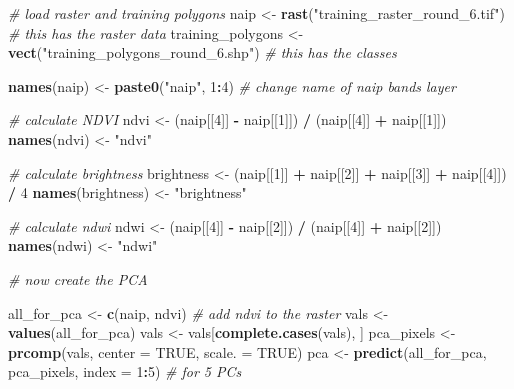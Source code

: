 \documentclass[
]{article}
\newenvironment{Shaded}{\begin{snugshade}}{\end{snugshade}}
\newcommand{\AttributeTok}[1]{\textcolor[rgb]{0.13,0.29,0.53}{#1}}
\newcommand{\CommentTok}[1]{\textcolor[rgb]{0.56,0.35,0.01}{\textit{#1}}}
\newcommand{\ConstantTok}[1]{\textcolor[rgb]{0.56,0.35,0.01}{#1}}
\newcommand{\DecValTok}[1]{\textcolor[rgb]{0.00,0.00,0.81}{#1}}
\newcommand{\FunctionTok}[1]{\textcolor[rgb]{0.13,0.29,0.53}{\textbf{#1}}}
\newcommand{\NormalTok}[1]{#1}
\newcommand{\OtherTok}[1]{\textcolor[rgb]{0.56,0.35,0.01}{#1}}
\newcommand{\SpecialCharTok}[1]{\textcolor[rgb]{0.81,0.36,0.00}{\textbf{#1}}}
\newcommand{\StringTok}[1]{\textcolor[rgb]{0.31,0.60,0.02}{#1}}
\begin{document}
\begin{Shaded}
\begin{Highlighting}[]
\CommentTok{\# load raster and training polygons}
\NormalTok{naip }\OtherTok{\textless{}{-}} \FunctionTok{rast}\NormalTok{(}\StringTok{"training\_raster\_round\_6.tif"}\NormalTok{) }\CommentTok{\# this has the raster data    }
\NormalTok{training\_polygons }\OtherTok{\textless{}{-}} \FunctionTok{vect}\NormalTok{(}\StringTok{"training\_polygons\_round\_6.shp"}\NormalTok{) }\CommentTok{\# this has the classes}

\FunctionTok{names}\NormalTok{(naip) }\OtherTok{\textless{}{-}} \FunctionTok{paste0}\NormalTok{(}\StringTok{"naip"}\NormalTok{, }\DecValTok{1}\SpecialCharTok{:}\DecValTok{4}\NormalTok{) }\CommentTok{\# change name of naip bands layer}

\CommentTok{\# calculate NDVI}
\NormalTok{ndvi }\OtherTok{\textless{}{-}}\NormalTok{ (naip[[}\DecValTok{4}\NormalTok{]] }\SpecialCharTok{{-}}\NormalTok{ naip[[}\DecValTok{1}\NormalTok{]]) }\SpecialCharTok{/}\NormalTok{ (naip[[}\DecValTok{4}\NormalTok{]] }\SpecialCharTok{+}\NormalTok{ naip[[}\DecValTok{1}\NormalTok{]])}
\FunctionTok{names}\NormalTok{(ndvi) }\OtherTok{\textless{}{-}} \StringTok{"ndvi"}

\CommentTok{\# calculate brightness}
\NormalTok{brightness }\OtherTok{\textless{}{-}}\NormalTok{ (naip[[}\DecValTok{1}\NormalTok{]] }\SpecialCharTok{+}\NormalTok{ naip[[}\DecValTok{2}\NormalTok{]] }\SpecialCharTok{+}\NormalTok{ naip[[}\DecValTok{3}\NormalTok{]] }\SpecialCharTok{+}\NormalTok{ naip[[}\DecValTok{4}\NormalTok{]]) }\SpecialCharTok{/} \DecValTok{4}
\FunctionTok{names}\NormalTok{(brightness) }\OtherTok{\textless{}{-}} \StringTok{"brightness"}

\CommentTok{\# calculate ndwi}
\NormalTok{ndwi }\OtherTok{\textless{}{-}}\NormalTok{ (naip[[}\DecValTok{4}\NormalTok{]] }\SpecialCharTok{{-}}\NormalTok{ naip[[}\DecValTok{2}\NormalTok{]]) }\SpecialCharTok{/}\NormalTok{ (naip[[}\DecValTok{4}\NormalTok{]] }\SpecialCharTok{+}\NormalTok{ naip[[}\DecValTok{2}\NormalTok{]])}
\FunctionTok{names}\NormalTok{(ndwi) }\OtherTok{\textless{}{-}} \StringTok{"ndwi"}

\CommentTok{\# now create the PCA }

\NormalTok{all\_for\_pca }\OtherTok{\textless{}{-}} \FunctionTok{c}\NormalTok{(naip, ndvi)  }\CommentTok{\# add ndvi to the raster}
\NormalTok{vals }\OtherTok{\textless{}{-}} \FunctionTok{values}\NormalTok{(all\_for\_pca)}
\NormalTok{vals }\OtherTok{\textless{}{-}}\NormalTok{ vals[}\FunctionTok{complete.cases}\NormalTok{(vals), ]}
\NormalTok{pca\_pixels }\OtherTok{\textless{}{-}} \FunctionTok{prcomp}\NormalTok{(vals, }\AttributeTok{center =} \ConstantTok{TRUE}\NormalTok{, }\AttributeTok{scale. =} \ConstantTok{TRUE}\NormalTok{)}
\NormalTok{pca }\OtherTok{\textless{}{-}} \FunctionTok{predict}\NormalTok{(all\_for\_pca, pca\_pixels, }\AttributeTok{index =} \DecValTok{1}\SpecialCharTok{:}\DecValTok{5}\NormalTok{)  }\CommentTok{\# for 5 PCs}
\end{Highlighting}
\end{Shaded}
\end{document}
